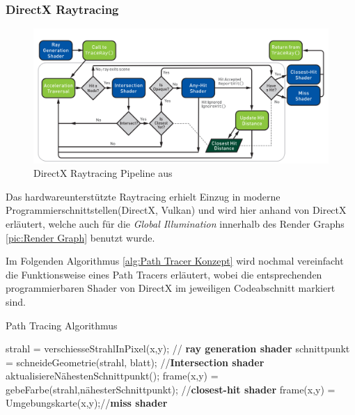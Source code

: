 \subsubsection{DirectX Raytracing}

\begin{figure}[H]
    \centering
    \includegraphics[width=\linewidth]{content/PathTracer/Bilder/DirectXRaytracingPipeline.png}
    \caption{DirectX Raytracing Pipeline aus \cite{Haines2019}}
    \label{pic:DirectXRaytracingPipeline}
\end{figure}

Das hardwareunterstützte Raytracing erhielt Einzug in moderne Programmierschnittstellen(DirectX, Vulkan) und wird 
hier anhand von DirectX erläutert, welche auch für die \textit{Global Illumination} innerhalb des 
Render Graphs \ref{pic:Render Graph} benutzt wurde. 

Im Folgenden Algorithmus \ref{alg:Path Tracer Konzept} wird nochmal vereinfacht die Funktionsweise 
eines Path Tracers erläutert, wobei die entsprechenden programmierbaren Shader von DirectX 
im jeweiligen Codeabschnitt markiert sind.

\begin{algorithm}[H]
    \caption{Path Tracing Algorithmus}
    \begin{algorithmic}[1]
        \State strahl = verschiesseStrahlInPixel(x,y); // \textbf{ray generation shader}
        \State schnittpunkt = schneideGeometrie(strahl, blatt); //\textbf{Intersection shader}
        \State aktualisiereNähestenSchnittpunkt();
        \EndIf
        \EndFor
        \State frame(x,y) = gebeFarbe(strahl,nähesterSchnittpunkt); //\textbf{closest-hit shader}
        \Else
        \State frame(x,y) = Umgebungskarte(x,y);//\textbf{miss shader}
        \EndIf
        \EndFor
        \EndProcedure
    \end{algorithmic}
    \label{alg:Path Tracer Konzept}
\end{algorithm}


